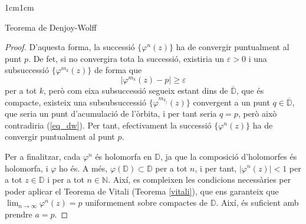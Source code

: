\begin{adjustwidth}{1cm}{1cm}
\begin{subsection}{Teorema de Denjoy-Wolff}
\begin{proof}
        D'aquesta forma, la successió $\{\varphi^n(z)\}$ ha de convergir puntualment al punt $p$. De fet, si no convergira tota la successió, existiria un $\varepsilon>0$ i una subsuccessió $\{\varphi^{m_k}(z)\}$ de forma que
        \begin{equation}
            |\varphi^{m_k}(z)-p|\geq \varepsilon
            \label{eq_dw}
        \end{equation}
        per a tot $k$, però com eixa subsuccessió segueix estant dins de $\overline{\mathbb{D}}$, que és compacte, existeix una subsubsuccessió $\{\varphi^{m_{k_j}}(z)\}$ convergent a un punt $q\in\overline{\mathbb{D}}$, que seria un punt d'acumulació de l'òrbita, i per tant seria $q=p$, però això contradiria (\ref{eq_dw}). Per tant, efectivament la successió $\{\varphi^n(z)\}$ ha de convergir puntualment al punt $p$.

        Per a finalitzar, cada $\varphi^n$ és holomorfa en $\mathbb{D}$, ja que la composició d'holomorfes és holomorfa, i $\varphi$ ho és. A més, $\varphi(\mathbb{D})\subset \mathbb{D}$ per a tot $n$, i per tant, $|\varphi^n(z)|<1$ per a tot $z\in \mathbb{D}$ i per a tot $n\in \mathbb{N}$. Així, es compleixen les condicions necessàries per poder aplicar el Teorema de Vitali (Teorema \ref{vitali}), que ens garanteix que $\displaystyle\lim_{n\to\infty}\varphi^n(z)=p$ uniformement sobre compactes de $\mathbb{D}$. Així, és suficient amb prendre $a=p$.

    \end{proof}

\end{subsection}

\end{adjustwidth}